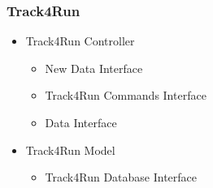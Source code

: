 \documentclass[../../DD.tex]{subfiles}
\begin{document}
		\subsubsection{Track4Run}
		\begin{itemize}
			\item Track4Run Controller
			\begin{itemize}
				\item New Data Interface
				\item Track4Run Commands Interface
				\item Data Interface
			\end{itemize}
			\item Track4Run Model
			\begin{itemize}
				\item Track4Run Database Interface
			\end{itemize}
		\end{itemize}
\end{document}
